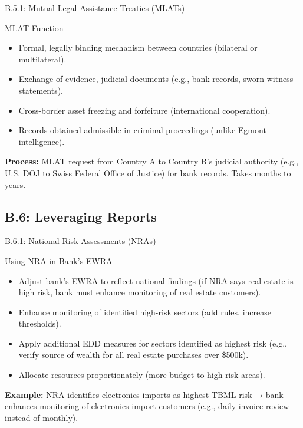 \documentclass{beamer}
\begin{document}
	\begin{frame}{B.5.1: Mutual Legal Assistance Treaties (MLATs)}
		\begin{block}{MLAT Function}
			\begin{itemize}
				\item Formal, legally binding mechanism between countries (bilateral or multilateral).
				\item Exchange of evidence, judicial documents (e.g., bank records, sworn witness statements).
				\item Cross-border asset freezing and forfeiture (international cooperation).
				\item Records obtained admissible in criminal proceedings (unlike Egmont intelligence).
			\end{itemize}
		\end{block}
		\textbf{Process:} MLAT request from Country A to Country B's judicial authority (e.g., U.S. DOJ to Swiss Federal Office of Justice) for bank records. Takes months to years.
	\end{frame}
	
	\subsection{B.6: Leveraging Reports}
	
	\begin{frame}{B.6.1: National Risk Assessments (NRAs)}
		\begin{block}{Using NRA in Bank's EWRA}
			\begin{itemize}
				\item Adjust bank's EWRA to reflect national findings (if NRA says real estate is high risk, bank must enhance monitoring of real estate customers).
				\item Enhance monitoring of identified high-risk sectors (add rules, increase thresholds).
				\item Apply additional EDD measures for sectors identified as highest risk (e.g., verify source of wealth for all real estate purchases over \$500k).
				\item Allocate resources proportionately (more budget to high-risk areas).
			\end{itemize}
		\end{block}
		\textbf{Example:} NRA identifies electronics imports as highest TBML risk → bank enhances monitoring of electronics import customers (e.g., daily invoice review instead of monthly).
	\end{frame}
	
\end{document}
